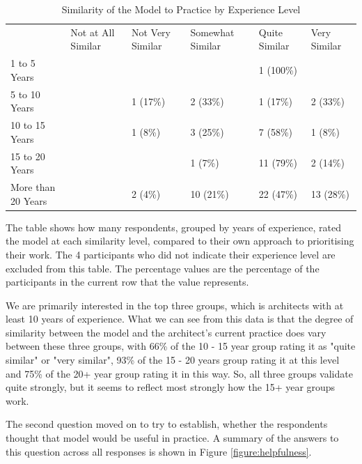 \begin{table}
\caption{Similarity of the Model to Practice by Experience Level}
\label{table:similaritybyexp}
\footnotesize
\begin{tabular}{l p{1.5cm} p{1.5cm} p{1.5cm} p{1.5cm} p{1.5cm}}
                & Not at All Similar & Not Very Similar & Somewhat Similar & Quite Similar & Very Similar \\
1 to 5 Years       & &          &           & 1 (100\%) &	        \\
5 to 10 Years      & & 1 (17\%) & 2 (33\%)  & 1 (17\%)  & 2 (33\%)  \\
10 to 15 Years     & & 1 (8\%)  & 3 (25\%)  & 7 (58\%)  & 1 (8\%)   \\
15 to 20 Years     & &          & 1 (7\%)   & 11 (79\%) & 2 (14\%)  \\
More than 20 Years & & 2 (4\%)  & 10 (21\%) & 22 (47\%) & 13 (28\%) \\
\end{tabular}
\end{table}

The table shows how many respondents, grouped by years of experience, rated the model at each similarity level, compared to their own approach to prioritising their work.  The 4 participants who did not indicate their experience level are excluded from this table.  The percentage values are the percentage of the participants in the current row that the value represents.

We are primarily interested in the top three groups, which is architects with at least 10 years of experience.  What we can see from this data is that the degree of similarity between the model and the architect's current practice does vary between these three groups, with 66\% of the 10 - 15 year group rating it as "quite similar" or "very similar", 93\% of the 15 - 20 years group rating it at this level and 75\% of the 20+ year group rating it in this way.  So, all three groups validate quite strongly, but it seems to reflect most strongly how the 15+ year groups work.

The second question moved on to try to establish, whether the respondents thought that model would be useful in practice.  A summary of the answers to this question across all responses is shown in Figure \ref{figure:helpfulness}.
 
